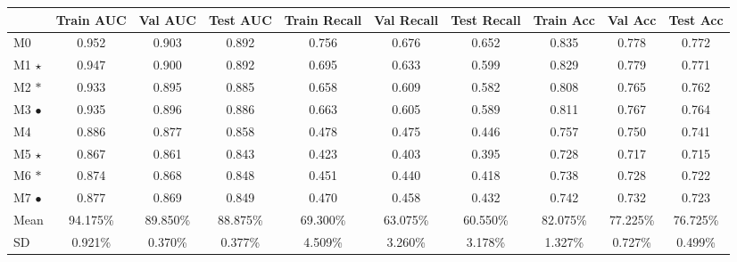 \documentclass[dvipsnames,mathserif]{beamer}
\begin{document}
{\begin{frame}
  \begin{table}
    \centering
    \begin{adjustbox}{width=\textwidth}
    \begin{tabular}{lccccccccc}
      \toprule
      & \textbf{Train AUC} & \textbf{Val AUC} & \textbf{Test AUC} & \textbf{Train Recall} & \textbf{Val Recall} & \textbf{Test Recall} & \textbf{Train Acc} & \textbf{Val Acc} & \textbf{Test Acc} \\
      \midrule
      M0 & 0.952 & 0.903 & 0.892 & 0.756 & 0.676 & 0.652 & 0.835 & 0.778 & 0.772 \\
      M1 $\star$ & 0.947 & 0.900 & 0.892 & 0.695 & 0.633 & 0.599 & 0.829 & 0.779 & 0.771 \\
      M2 $\ast$ & 0.933 & 0.895 & 0.885 & 0.658 & 0.609 & 0.582 & 0.808 & 0.765 & 0.762 \\
      M3 $\bullet$ & 0.935 & 0.896 & 0.886 & 0.663 & 0.605 & 0.589 & 0.811 & 0.767 & 0.764 \\
      \midrule
      \cellcolor{gray!50}M4 & \cellcolor{gray!50}0.886 & \cellcolor{gray!50}0.877 & \cellcolor{gray!50}0.858 & \cellcolor{gray!50}0.478 & \cellcolor{gray!50}0.475 & \cellcolor{gray!50}0.446 & \cellcolor{gray!50}0.757 & \cellcolor{gray!50}0.750 & \cellcolor{gray!50}0.741 \\
      \cellcolor{gray!50}M5 $\star$ & \cellcolor{gray!50}0.867 & \cellcolor{gray!50}0.861 & \cellcolor{gray!50}0.843 & \cellcolor{gray!50}0.423 & \cellcolor{gray!50}0.403 & \cellcolor{gray!50}0.395 & \cellcolor{gray!50}0.728 & \cellcolor{gray!50}0.717 &  \cellcolor{gray!50}0.715 \\
      \cellcolor{gray!50}M6 $\ast$ & \cellcolor{gray!50}0.874 & \cellcolor{gray!50}0.868 & \cellcolor{gray!50}0.848 & \cellcolor{gray!50}0.451 & \cellcolor{gray!50}0.440 & \cellcolor{gray!50}0.418 & \cellcolor{gray!50}0.738 & \cellcolor{gray!50}0.728 &  \cellcolor{gray!50}0.722 \\
      \cellcolor{gray!50}M7 $\bullet$ & \cellcolor{gray!50}0.877 & \cellcolor{gray!50}0.869 & \cellcolor{gray!50}0.849 & \cellcolor{gray!50}0.470 & \cellcolor{gray!50}0.458 & \cellcolor{gray!50}0.432 & \cellcolor{gray!50}0.742 & \cellcolor{gray!50}0.732 &  \cellcolor{gray!50}0.723 \\

      \midrule

      Mean &  94.175\% & 89.850\% & 88.875\%  & 69.300\% & 63.075\% & 60.550\% & 82.075\% & 77.225\% & 76.725\% \\
      SD   & 0.921\% & 0.370\% & 0.377\%  &  4.509\% & 3.260\% & 3.178\% & 1.327\% & 0.727\% & 0.499\% \\


\end{tabular}
\end{adjustbox}
\end{table}
\end{frame}}
\end{document}

